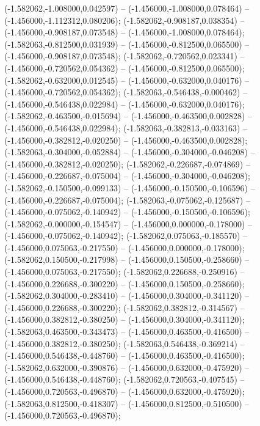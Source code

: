  (-1.582062,-1.008000,0.042597) -- (-1.456000,-1.008000,0.078464) -- (-1.456000,-1.112312,0.080206);
 (-1.582062,-0.908187,0.038354) -- (-1.456000,-0.908187,0.073548) -- (-1.456000,-1.008000,0.078464);
 (-1.582063,-0.812500,0.031939) -- (-1.456000,-0.812500,0.065500) -- (-1.456000,-0.908187,0.073548);
 (-1.582062,-0.720562,0.023341) -- (-1.456000,-0.720562,0.054362) -- (-1.456000,-0.812500,0.065500);
 (-1.582062,-0.632000,0.012545) -- (-1.456000,-0.632000,0.040176) -- (-1.456000,-0.720562,0.054362);
 (-1.582063,-0.546438,-0.000462) -- (-1.456000,-0.546438,0.022984) -- (-1.456000,-0.632000,0.040176);
 (-1.582062,-0.463500,-0.015694) -- (-1.456000,-0.463500,0.002828) -- (-1.456000,-0.546438,0.022984);
 (-1.582063,-0.382813,-0.033163) -- (-1.456000,-0.382812,-0.020250) -- (-1.456000,-0.463500,0.002828);
 (-1.582063,-0.304000,-0.052884) -- (-1.456000,-0.304000,-0.046208) -- (-1.456000,-0.382812,-0.020250);
 (-1.582062,-0.226687,-0.074869) -- (-1.456000,-0.226687,-0.075004) -- (-1.456000,-0.304000,-0.046208);
 (-1.582062,-0.150500,-0.099133) -- (-1.456000,-0.150500,-0.106596) -- (-1.456000,-0.226687,-0.075004);
 (-1.582063,-0.075062,-0.125687) -- (-1.456000,-0.075062,-0.140942) -- (-1.456000,-0.150500,-0.106596);
 (-1.582062,-0.000000,-0.154547) -- (-1.456000,0.000000,-0.178000) -- (-1.456000,-0.075062,-0.140942);
 (-1.582062,0.075063,-0.185570) -- (-1.456000,0.075063,-0.217550) -- (-1.456000,0.000000,-0.178000);
 (-1.582062,0.150500,-0.217998) -- (-1.456000,0.150500,-0.258660) -- (-1.456000,0.075063,-0.217550);
 (-1.582062,0.226688,-0.250916) -- (-1.456000,0.226688,-0.300220) -- (-1.456000,0.150500,-0.258660);
 (-1.582062,0.304000,-0.283410) -- (-1.456000,0.304000,-0.341120) -- (-1.456000,0.226688,-0.300220);
 (-1.582062,0.382812,-0.314567) -- (-1.456000,0.382812,-0.380250) -- (-1.456000,0.304000,-0.341120);
 (-1.582063,0.463500,-0.343473) -- (-1.456000,0.463500,-0.416500) -- (-1.456000,0.382812,-0.380250);
 (-1.582063,0.546438,-0.369214) -- (-1.456000,0.546438,-0.448760) -- (-1.456000,0.463500,-0.416500);
 (-1.582062,0.632000,-0.390876) -- (-1.456000,0.632000,-0.475920) -- (-1.456000,0.546438,-0.448760);
 (-1.582062,0.720563,-0.407545) -- (-1.456000,0.720563,-0.496870) -- (-1.456000,0.632000,-0.475920);
 (-1.582063,0.812500,-0.418307) -- (-1.456000,0.812500,-0.510500) -- (-1.456000,0.720563,-0.496870);
